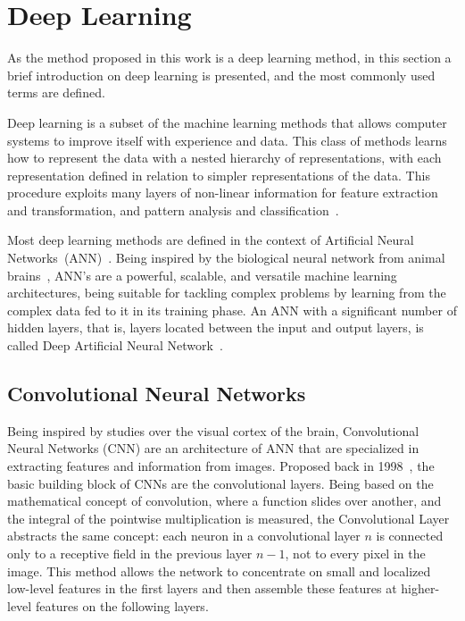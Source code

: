 \section{Deep Learning}
\label{sec:deep-learning}

As the method proposed in this work is a deep learning method, in this section a brief introduction on deep learning is presented, and the most commonly used terms are defined.

Deep learning is a subset of the machine learning methods that allows computer systems to improve itself with experience and data. This class of methods learns how to represent the data with a nested hierarchy of representations, with each representation defined in relation to simpler representations of the data. This procedure exploits many layers of non-linear information for feature extraction and transformation, and pattern analysis and classification~\cite{goodfellow,deepmethods}.

Most deep learning methods are defined in the context of Artificial Neural Networks~(ANN)~\cite{handsonml}. Being inspired by the biological neural network from animal brains~\cite{logicalcalculus}, ANN's are a powerful, scalable, and versatile machine learning architectures, being suitable for tackling complex problems by learning from the complex data fed to it in its training phase. An ANN with a significant number of hidden layers, that is, layers located between the input and output layers, is called Deep Artificial Neural Network~\cite{deepmethods}.  

\subsection{Convolutional Neural Networks}

Being inspired by studies over the visual cortex of the brain, Convolutional Neural Networks (CNN) are an architecture of ANN that are specialized in extracting features and information from images. Proposed back in 1998~\cite{lenet}, the basic building block of CNNs are the convolutional layers. Being based on the mathematical concept of convolution, where a function slides over another, and the integral of the pointwise multiplication is measured, the Convolutional Layer abstracts the same concept: each neuron in a convolutional layer $n$ is connected only to a receptive field in the previous layer $n-1$, not to every pixel in the image. This method allows the network to concentrate on small and localized low-level features in the first layers and then assemble these features at higher-level features on the following layers.



